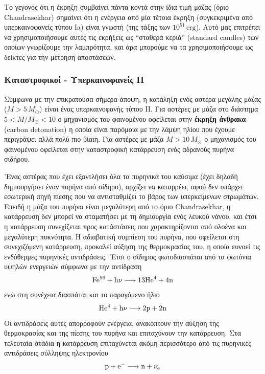 Το γεγονός ότι η έκρηξη συμβαίνει πάντα κοντά στην ίδια τιμή μάζας (όριο Chandrasekhar) σημαίνει ότι η ενέργεια από μία τέτοια έκρηξη (συγκεκριμένα από υπερκαινοφανείς τύπου Ia) είναι γνωστή (της τάξης των $10^{51}\,\text{erg}$). Αυτό μας επιτρέπει να χρησιμοποιήσουμε αυτές τις εκρήξεις ως ``σταθερά κεριά'' (standard candles) των οποίων γνωρίζουμε την λαμπρότητα, και άρα μπορούμε να τα χρησιμοποιήσουμε ως δείκτες για την μέτρηση αποστάσεων.


\subsubsection{Καταστροφικοί - Υπερκαινοφανείς II}
Σύμφωνα με την επικρατούσα σήμερα άποψη, η κατάληξη ενός αστέρα μεγάλης μάζας ($M > 5\,M_\odot$) είναι ένας υπερκαινοφανής τύπου II. Για αστέρες με μάζα στο διάστημα $5 < M/M_\odot < 10$ ο μηχανισμός του φαινομένου οφείλεται στην \textbf{έκρηξη άνθρακα} (carbon detonation) η οποία είναι παρόμοια με την λάμψη ηλίου που έχουμε περιγράψει αλλά πολύ πιο βίαιη. Για αστέρες με μάζα $M > 10\,M_\odot$ ο μηχανισμός του φαινομένου οφείλεται στην καταστροφική κατάρρευση ενός αδρανούς πυρήνα σιδήρου.

'Ενας αστέρας που έχει εξαντλήσει όλα τα πυρηνικά του καύσιμα (έχει δηλαδή δημιουργήσει έναν πυρήνα από σίδηρο), αρχίζει να καταρρέει, αφού δεν υπάρχει εσωτερική πηγή πίεσης που να αντισταθμίζει το βάρος των υπερκείμενων στρωμάτων. Επειδή η μάζα του πυρήνα είναι μεγαλύτερη από το όριο Chandrasekhar, η κατάρρευση δεν μπορεί να σταματήσει με τη δημιουργία ενός λευκού νάνου, και έτσι η κατάρρευση συνεχίζεται προς κατάστάσεις που χαρακτηρίζονται από ολοένα και μεγαλύτερη πυκνότητα. Η αδιαβατική συμπίεση του πυρήνα, που οφείλεται στη συνεχιζόμενη κατάρρευση, προκαλεί αύξηση της θερμοκρασίας του, η οποία ευνοεί τις ενδόθερμες πυρηνικές αντιδράσεις. 'Ετσι ο σίδηρος φωτοδιασπάται από τα φωτόνια υψηλών ενεργειών σύμφωνα με την αντίδραση
$$\rm Fe^{56} + h\nu \longrightarrow \rm 13 He^4 + 4n$$
ενώ στη συνέχεια διασπάται και το παραγόμενο ήλιο
$$\rm He^4 + h\nu \longrightarrow \rm 2p + 2n$$
Οι αντιδράσεις αυτές απορροφούν ενέργεια, ανακόπτουν την αύξηση της θερμοκρασίας και της πίεσης του πυρήνα και επιταχύνουν την κατάρρευση. Στα τελευταία στάδια η κατάρρευση επιταχύνεται ακόμη περισσότερο από τις πυρηνικές αντιδράσεις σύλληψης ηλεκτρονίου
$$\rm p + e^{-} \longrightarrow \rm n + \nu_e$$

